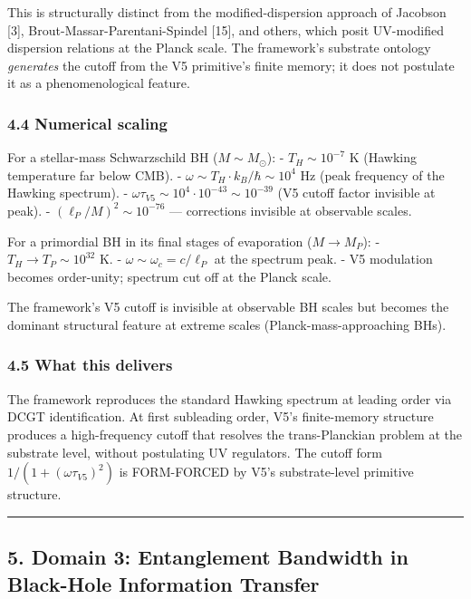 \documentclass[
  11pt,
  a4paperpaper,
]{article}
\begin{document}
This is structurally distinct from the modified-dispersion approach of
Jacobson {[}3{]}, Brout-Massar-Parentani-Spindel {[}15{]}, and others,
which posit UV-modified dispersion relations at the Planck scale. The
framework's substrate ontology \emph{generates} the cutoff from the V5
primitive's finite memory; it does not postulate it as a
phenomenological feature.

\subsubsection{4.4 Numerical scaling}\label{numerical-scaling}

For a stellar-mass Schwarzschild BH (\(M \sim M_\odot\)): -
\(T_H \sim 10^{-7}\) K (Hawking temperature far below CMB). -
\(\omega \sim T_H \cdot k_B/\hbar \sim 10^4\) Hz (peak frequency of the
Hawking spectrum). -
\(\omega\tau_{V5} \sim 10^4 \cdot 10^{-43} \sim 10^{-39}\) (V5 cutoff
factor invisible at peak). - \((\ell_P/M)^2 \sim 10^{-76}\) ---
corrections invisible at observable scales.

For a primordial BH in its final stages of evaporation (\(M \to M_P\)):
- \(T_H \to T_P \sim 10^{32}\) K. - \(\omega \sim \omega_c = c/\ell_P\)
at the spectrum peak. - V5 modulation becomes order-unity; spectrum cut
off at the Planck scale.

The framework's V5 cutoff is invisible at observable BH scales but
becomes the dominant structural feature at extreme scales
(Planck-mass-approaching BHs).

\subsubsection{4.5 What this delivers}\label{what-this-delivers-1}

The framework reproduces the standard Hawking spectrum at leading order
via DCGT identification. At first subleading order, V5's finite-memory
structure produces a high-frequency cutoff that resolves the
trans-Planckian problem at the substrate level, without postulating UV
regulators. The cutoff form \(1/(1+(\omega\tau_{V5})^2)\) is FORM-FORCED
by V5's substrate-level primitive structure.

\begin{center}\rule{0.5\linewidth}{0.5pt}\end{center}

\subsection{5. Domain 3: Entanglement Bandwidth in Black-Hole
Information
Transfer}\label{domain-3-entanglement-bandwidth-in-black-hole-information-transfer}
\end{document}
